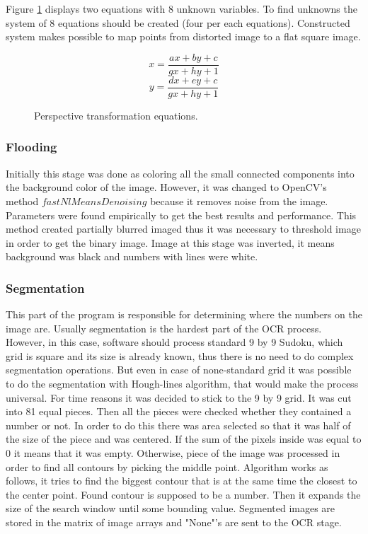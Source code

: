 \documentclass[../../main]{subfiles}
\begin{document}
Figure \ref{eq:persptransform} displays two equations with 8 unknown variables. To find unknowns the system of 8 equations should be created (four per each equations). Constructed system makes possible to map points from distorted image to a flat square image.

\begin{figure} [!ht]
  \centering    
    \begin{equation}
        x = \frac{ax+by+c}{gx+hy+1}
    \end{equation}
     \begin{equation}
        y = \frac{dx+ey+c}{gx+hy+1}
    \end{equation}
  \caption{Perspective transformation equations.}
  \label{eq:persptransform}
\end{figure}

\subsubsection{Flooding}

Initially this stage was done as coloring all the small connected components into the background color of the image. However, it was changed to \ac{OpenCV}'s method $fastNlMeansDenoising$ because it removes noise from the image. Parameters were found empirically to get the best results and performance. This method created partially blurred imaged thus it was necessary to threshold image in order to get the binary image. Image at this stage was inverted, it means background was black and numbers with lines were white.

\subsubsection{Segmentation}

This part of the program is responsible for determining where the numbers on the image are. Usually segmentation is the hardest part of the OCR process. However, in this case, software should process standard 9 by 9 Sudoku, which grid is square and its size is already known, thus there is no need to do complex segmentation operations. But even in case of none-standard grid it was possible to do the segmentation with Hough-lines algorithm, that would make the process universal. For time reasons it was decided to stick to the 9 by 9 grid. It was cut into 81 equal pieces. Then all the pieces were checked whether they contained a number or not. In order to do this there was area selected so that it was half of the size of the piece and was centered. If the sum of the pixels inside was equal to 0 it means that it was empty. Otherwise, piece of the image was processed in order to find all contours by picking the middle point. Algorithm works as follows, it tries to find the biggest contour that is at the same time the closest to the center point. Found contour is supposed to be a number. Then it expands the size of the search window until some bounding value. Segmented images are stored in the matrix of image arrays and "None"'s are sent to the OCR stage.
\end{document}
